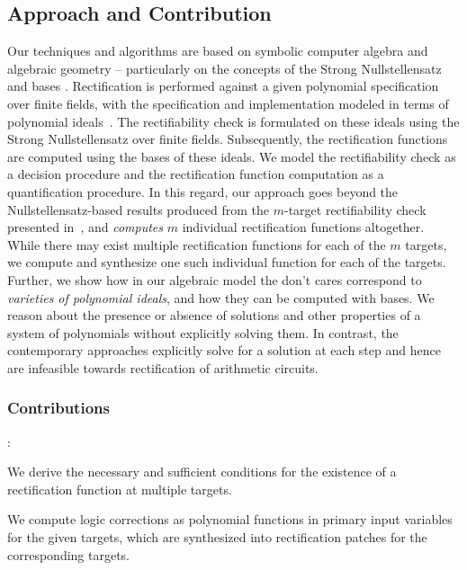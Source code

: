 \subsection{Approach and Contribution}
 Our techniques and algorithms are based on symbolic computer algebra
and algebraic geometry -- particularly on the concepts of the Strong
Nullstellensatz and \Grobner bases \cite{gb_book}. Rectification is 
performed against a given polynomial specification over finite fields, 
with the specification and implementation modeled in terms of polynomial 
ideals~\cite{gb_book}. The rectifiability check is formulated on these 
ideals using the Strong Nullstellensatz over finite fields. Subsequently, 
the rectification functions are computed using the \Grobner bases of these ideals. 
We model the rectifiability check as a decision procedure and the rectification 
function computation as a quantification procedure. 
In this regard, our approach goes beyond the Nullstellensatz-based 
results produced from the $m$-target rectifiability check presented 
in~\cite{Vkrao:ISQED21}, and {\it computes} $m$ individual rectification 
functions altogether. While there may exist multiple rectification functions 
for each of the $m$ targets, we compute and synthesize one such individual 
function for each of the targets. Further, we show how in our algebraic model 
the don't cares correspond to {\it varieties of polynomial ideals}, and how 
they can be computed with \Grobner bases.
We reason about the presence or absence of solutions 
and other properties of a system of polynomials without explicitly solving them. 
In contrast, the contemporary approaches explicitly solve for a solution at 
each step and hence are infeasible towards rectification of arithmetic circuits.

\subsubsection{Contributions}:
\bi
\item We derive the necessary and sufficient conditions
for the existence of a rectification function at multiple targets.

\item We compute logic corrections as polynomial functions in primary input variables
for the given targets, which are synthesized into rectification patches for the corresponding targets.

